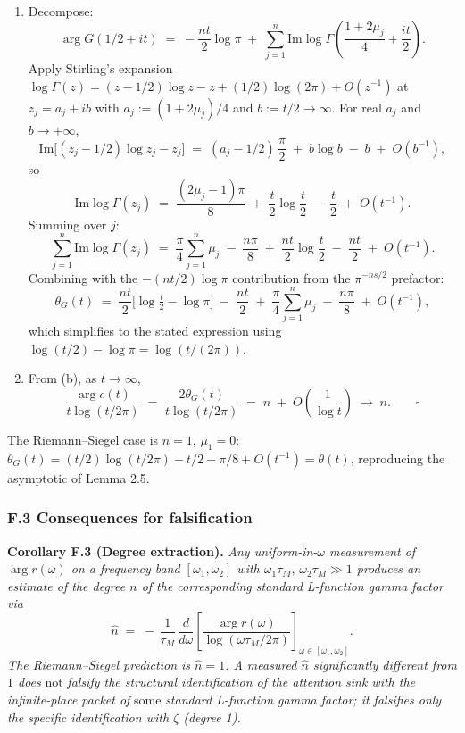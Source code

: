 \documentclass[
  letterpaper,
  11pt]{article}
\theoremstyle{plain}
\theoremstyle{definition}
\theoremstyle{remark}
\begin{document}
\begin{enumerate}
\def\labelenumi{(\alph{enumi})}
\setcounter{enumi}{1}
\item
  Decompose:
  \[\arg G(1/2 + it) \;=\; -\frac{nt}{2}\log\pi \;+\; \sum_{j=1}^n \mathrm{Im}\log\Gamma\!\left(\frac{1 + 2\mu_j}{4} + \frac{it}{2}\right).\]
  Apply Stirling's expansion \(\log\Gamma(z) = (z - 1/2)\log z - z + (1/2)\log(2\pi) + O(z^{-1})\) at \(z_j = a_j + ib\) with \(a_j := (1 + 2\mu_j)/4\) and \(b := t/2 \to \infty\). For real \(a_j\) and \(b \to +\infty\),
  \[\mathrm{Im}\bigl[(z_j - 1/2)\log z_j - z_j\bigr] \;=\; (a_j - 1/2)\,\frac{\pi}{2} \;+\; b\log b \;-\; b \;+\; O(b^{-1}),\]
  so
  \[\mathrm{Im}\log\Gamma(z_j) \;=\; \frac{(2\mu_j - 1)\pi}{8} \;+\; \frac{t}{2}\log\frac{t}{2} \;-\; \frac{t}{2} \;+\; O(t^{-1}).\]
  Summing over \(j\):
  \[\sum_{j=1}^n \mathrm{Im}\log\Gamma(z_j) \;=\; \frac{\pi}{4}\sum_{j=1}^n \mu_j \;-\; \frac{n\pi}{8} \;+\; \frac{nt}{2}\log\frac{t}{2} \;-\; \frac{nt}{2} \;+\; O(t^{-1}).\]
  Combining with the \(-(nt/2)\log\pi\) contribution from the \(\pi^{-ns/2}\) prefactor:
  \[\theta_G(t) \;=\; \frac{nt}{2}\bigl[\log\tfrac{t}{2} - \log\pi\bigr] \;-\; \frac{nt}{2} \;+\; \frac{\pi}{4}\sum_{j=1}^n \mu_j \;-\; \frac{n\pi}{8} \;+\; O(t^{-1}),\]
  which simplifies to the stated expression using \(\log(t/2) - \log\pi = \log(t/(2\pi))\).
\item
  From (b), as \(t \to \infty\),
  \[\frac{\arg c(t)}{t\log(t/2\pi)} \;=\; \frac{2\theta_G(t)}{t\log(t/2\pi)} \;=\; n \;+\; O\!\left(\frac{1}{\log t}\right) \;\to\; n. \qquad \square\]
\end{enumerate}

The Riemann--Siegel case is \(n = 1\), \(\mu_1 = 0\): \(\theta_G(t) = (t/2)\log(t/2\pi) - t/2 - \pi/8 + O(t^{-1}) = \theta(t)\), reproducing the asymptotic of Lemma 2.5.

\subsubsection{F.3 Consequences for falsification}\label{f.3-consequences-for-falsification}

\textbf{Corollary F.3 (Degree extraction).} \emph{Any uniform-in-\(\omega\) measurement of \(\arg r(\omega)\) on a frequency band \([\omega_1, \omega_2]\) with \(\omega_1 \tau_M,\, \omega_2 \tau_M \gg 1\) produces an estimate of the degree \(n\) of the corresponding standard L-function gamma factor via}
\[\hat n \;=\; -\,\frac{1}{\tau_M}\,\frac{d}{d\omega}\!\left[\frac{\arg r(\omega)}{\log(\omega\tau_M / 2\pi)}\right]_{\omega \in [\omega_1, \omega_2]}.\]
\emph{The Riemann--Siegel prediction is \(\hat n = 1\). A measured \(\hat n\) significantly different from \(1\) does} not \emph{falsify the structural identification of the attention sink with the infinite-place packet of} some \emph{standard L-function gamma factor; it falsifies only the specific identification with \(\zeta\) (degree 1).}
\end{document}
